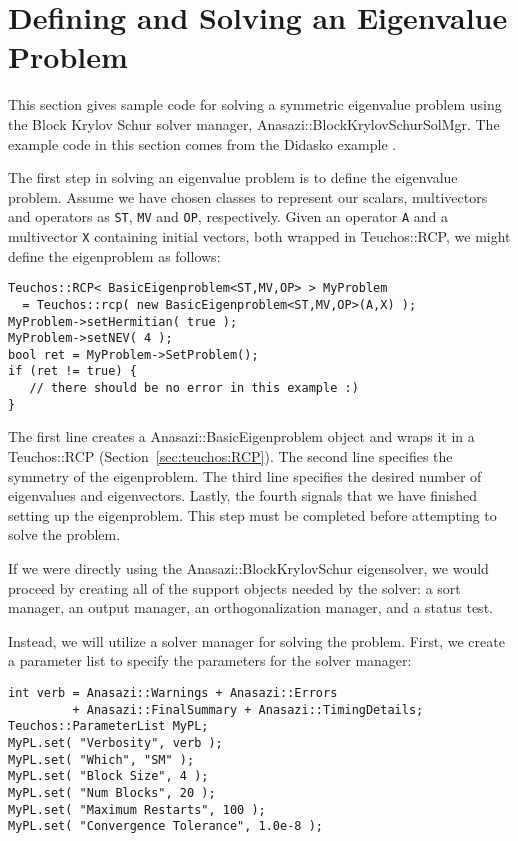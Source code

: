 \section{Defining and Solving an Eigenvalue Problem}
\label{sec:anasazi:example}

This section gives sample code for solving a symmetric eigenvalue problem using
the Block Krylov Schur solver manager, Anasazi::BlockKrylovSchurSolMgr. The example code in this section comes from the
Didasko example .

The first step in solving an eigenvalue problem is to define the eigenvalue
problem. Assume we have chosen classes to represent our scalars, multivectors
and operators as \verb!ST!, \verb!MV! and \verb!OP!, respectively. Given an
operator \verb!A! and a multivector \verb!X! containing initial vectors, both
wrapped in Teuchos::RCP, we might define the eigenproblem as
follows:
\begin{verbatim}
Teuchos::RCP< BasicEigenproblem<ST,MV,OP> > MyProblem 
  = Teuchos::rcp( new BasicEigenproblem<ST,MV,OP>(A,X) );
MyProblem->setHermitian( true );
MyProblem->setNEV( 4 );
bool ret = MyProblem->SetProblem();
if (ret != true) {
   // there should be no error in this example :)
}
\end{verbatim}

The first line creates a Anasazi::BasicEigenproblem object and wraps it in a
Teuchos::\-RCP (Section~\ref{sec:teuchos:RCP}). The second line
specifies the symmetry of the eigenproblem.
The third line specifies the desired
number of eigenvalues and eigenvectors. Lastly, the fourth signals that we have
finished setting up the eigenproblem. This step must be completed before
attempting to solve the problem.

If we were directly using the Anasazi::BlockKrylovSchur eigensolver, we would proceed by
creating all of the support objects needed by the solver: a sort manager, an output
manager, an orthogonalization manager, and a status test.

Instead, we will utilize a solver manager for solving the problem.
First, we create a parameter list to specify the parameters for the solver manager:
\begin{verbatim}
int verb = Anasazi::Warnings + Anasazi::Errors 
         + Anasazi::FinalSummary + Anasazi::TimingDetails;
Teuchos::ParameterList MyPL;
MyPL.set( "Verbosity", verb );
MyPL.set( "Which", "SM" );
MyPL.set( "Block Size", 4 );
MyPL.set( "Num Blocks", 20 );
MyPL.set( "Maximum Restarts", 100 );
MyPL.set( "Convergence Tolerance", 1.0e-8 );
\end{verbatim}


